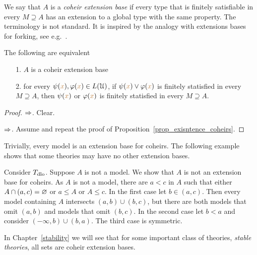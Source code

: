 \noindent\llap{\textcolor{red}{\Large\warning}\kern1.5ex}%
We say that $A$ is a \emph{coheir extension base\/} if every type that is finitely satisfiable in every $M\supseteq A$ has an extension to a global type with the same property.
The terminology is not standard.
It is inspired by the analogy with extensions bases for forking, see e.g.~\cite{Simon}.

\begin{proposition}\label{prop_exisntence_coheirs_over_sets}
  The following are equivalent
  \begin{itemize}
    \item[1.] $A$ is a coheir extension base
    \item[2.] for every $\psi({\color{brown} x}),\varphi({\color{brown} x})\in L(\EuScript U)$, if $\psi({\color{brown} x})\vee\varphi({\color{brown} x})$ is finitely statisfied in every $M\supseteq A$, then $\psi({\color{brown} x})$ or $\varphi({\color{brown} x})$ is finitely statisfied in every $M\supseteq A$. 
  \end{itemize}  
\end{proposition}
  
\begin{proof} 
  $\Rightarrow$. Clear.
  
  $\Rightarrow$. Assume  and repeat the proof of Proposition~\ref{prop_exisntence_coheirs}.
\end{proof}
  
Trivially, every model is an extension base for coheirs.
The following example shows that some theories may have no other extension bases.

\begin{example}
  Consider $T_{\rm dlo}$.
  Suppose $A$ is not a model.
  We show that $A$ is not an extension base for coheirs.
  As $A$ is not a model, there are $a<c$ in $A$ such that either $A\cap(a,c)=\varnothing$ or $a\le A$ or $A\le c$.
  In the first case let $b\in(a,c)$. 
  Then every model containing $A$ intersects $(a,b)\cup (b,c)$, but there are both models that omit $(a,b)$ and models that omit $(b,c)$.
  In the second case let $b<a$ and consider $(-\infty,b)\cup (b,a)$.
  The third case is symmetric.
\end{example}

In Chapter~\ref{stability} we will see that for some important class of theories, \textit{stable theories}, all sets are coheir extension bases.

